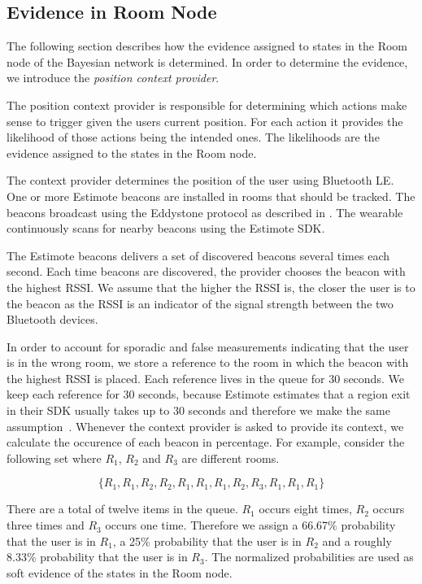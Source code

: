 \subsection{Evidence in Room Node}
\label{sec:design:bayesian-network:room-node-evidence}

The following section describes how the evidence assigned to states in the Room node of the Bayesian network is determined. In order to determine the evidence, we introduce the \emph{position context provider}.

The position context provider is responsible for determining which actions make sense to trigger given the users current position. For each action it provides the likelihood of those actions being the intended ones. The likelihoods are the evidence assigned to the states in the Room node.

The context provider determines the position of the user using Bluetooth LE. One or more Estimote beacons are installed in rooms that should be tracked. The beacons broadcast using the Eddystone protocol as described in . The wearable continuously scans for nearby beacons using the Estimote SDK.

The Estimote beacons delivers a set of discovered beacons several times each second. Each time beacons are discovered, the provider chooses the beacon with the highest RSSI. We assume that the higher the RSSI is, the closer the user is to the beacon as the RSSI is an indicator of the signal strength between the two Bluetooth devices.

In order to account for sporadic and false measurements indicating that the user is in the wrong room, we store a reference to the room in which the beacon with the highest RSSI is placed. Each reference lives in the queue for 30 seconds. We keep each reference for 30 seconds, because Estimote estimates that a region exit in their SDK usually takes up to 30 seconds and therefore we make the same assumption~\cite{estimote:beacon-monitoring}. Whenever the context provider is asked to provide its context, we calculate the occurence of each beacon in percentage. For example, consider the following set where $R_1$, $R_2$ and $R_3$ are different rooms.

\begin{equation*}
  \{ R_1, R_1, R_2, R_2, R_1, R_1, R_1, R_2, R_3, R_1, R_1, R_1 \}
\end{equation*}

There are a total of twelve items in the queue. $R_1$ occurs eight times, $R_2$ occurs three times and $R_3$ occurs one time. Therefore we assign a 66.67\% probability that the user is in $R_1$, a 25\% probability that the user is in $R_2$ and a roughly 8.33\% probability that the user is in $R_3$. The normalized probabilities are used as soft evidence of the states in the Room node.

